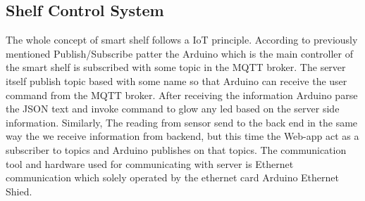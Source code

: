 \subsection{Shelf Control System}
The whole concept of smart shelf follows a IoT principle. According to previously mentioned Publish/Subscribe patter the Arduino which is the main controller of the smart shelf is subscribed with some topic in the MQTT broker. The server itself publish topic based with some name so that Arduino can receive the user command from the MQTT broker. After receiving the information Arduino parse the JSON text and invoke command to glow any led based on the server side information. Similarly, The reading from sensor send to the back end in the same way the we receive information from backend, but this time the Web-app act as a subscriber to topics and Arduino publishes on that topics.  The communication tool and hardware used for communicating with server is Ethernet communication which solely operated by the ethernet card Arduino Ethernet Shied.